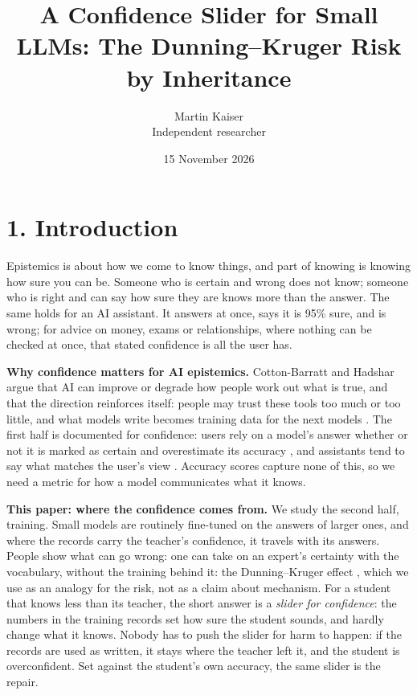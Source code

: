 \documentclass[10pt]{article}
\title{\textbf{A Confidence Slider for Small LLMs: The Dunning--Kruger Risk by Inheritance}}
\author{Martin Kaiser\\\small Independent researcher}
\date{15 November 2026}
\begin{document}
\maketitle

\begin{abstract}
\noindent
\abstractText{}
\end{abstract}

\section*{1. Introduction}

Epistemics is about how we come to know things, and part of knowing is knowing how sure you can be. Someone who is certain and wrong does not know; someone who is right and can say how sure they are knows more than the answer. The same holds for an AI assistant. It answers at once, says it is 95\% sure, and is wrong; for advice on money, exams or relationships, where nothing can be checked at once, that stated confidence is all the user has.

\textbf{Why confidence matters for AI epistemics.} Cotton-Barratt and Hadshar argue that AI can improve or degrade how people work out what is true, and that the direction reinforces itself: people may trust these tools too much or too little, and what models write becomes training data for the next models \cite{forethought,stray}. The first half is documented for confidence: users rely on a model's answer whether or not it is marked as certain \cite{zhou} and overestimate its accuracy \cite{steyvers}, and assistants tend to say what matches the user's view \cite{sharma}. Accuracy scores capture none of this, so we need a metric for how a model communicates what it knows.

\textbf{This paper: where the confidence comes from.} We study the second half, training. Small models are routinely fine-tuned on the answers of larger ones, and where the records carry the teacher's confidence, it travels with its answers. People show what can go wrong: one can take on an expert's certainty with the vocabulary, without the training behind it: the Dunning--Kruger effect \cite{kruger}, which we use as an analogy for the risk, not as a claim about mechanism. For a student that knows less than its teacher, the short answer is a \emph{slider for confidence}: the numbers in the training records set how sure the student sounds, and hardly change what it knows. Nobody has to push the slider for harm to happen: if the records are used as written, it stays where the teacher left it, and the student is overconfident. Set against the student's own accuracy, the same slider is the repair.
\end{document}
